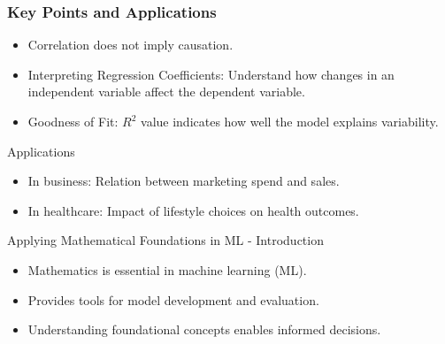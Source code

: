 \documentclass[aspectratio=169]{beamer}
\begin{document}
\begin{frame}[fragile]
    \frametitle{Key Points and Applications}
    \begin{itemize}
        \item Correlation does not imply causation.
        \item Interpreting Regression Coefficients: Understand how changes in an independent variable affect the dependent variable.
        \item Goodness of Fit: \( R^2 \) value indicates how well the model explains variability.
    \end{itemize}
    \begin{block}{Applications}
        \begin{itemize}
            \item In business: Relation between marketing spend and sales.
            \item In healthcare: Impact of lifestyle choices on health outcomes.
        \end{itemize}
    \end{block}
\end{frame}

\begin{frame}[fragile]{Applying Mathematical Foundations in ML - Introduction}
    \begin{itemize}
        \item Mathematics is essential in machine learning (ML).
        \item Provides tools for model development and evaluation.
        \item Understanding foundational concepts enables informed decisions.
    \end{itemize}
\end{frame}
\end{document}
